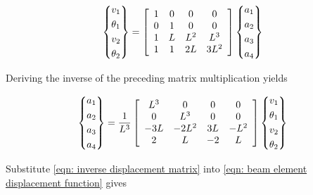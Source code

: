 \documentclass[a4paper,openany,nobib]{tufte-book}
\begin{document}
{{$$\left\{ \begin{gathered}
  v_1 \hfill \\
  \theta _1 \hfill \\
  v_2 \hfill \\
  \theta _2 \hfill \\ 
\end{gathered}  \right\} = \left[ {\begin{array}{*{20}{c}}
  1&0&0&0 \\ 
  0&1&0&0 \\ 
  1&L&L^2&L^3 \\ 
  1&1&2L&3L^2 
\end{array}} \right]\left\{ \begin{gathered}
  a_1 \hfill \\
  a_2 \hfill \\
  a_3 \hfill \\
  a_4 \hfill \\ 
\end{gathered}  \right\}$$

Deriving the inverse of the preceding matrix multiplication yields

\begin{gather*}
\label{eqn: inverse displacement matrix}
  \left\{
    \begin{gathered}
      a_1 \hfill \\
      a_2 \hfill \\
      a_3 \hfill \\
      a_4 \hfill \\ 
    \end{gathered}  \right\} = \frac{1}{L^3}\left[{
      \begin{array}{*{20}{c}}
        L^3&0&0&0 \\ 
        0&L^3&0&0 \\ 
        -3L&-2L^2&3L&-L^2 \\ 
        2&L&-2&L 
      \end{array}} \right]\left\{
    \begin{gathered}
      v_1 \hfill \\
      \theta_1 \hfill \\
      v_2 \hfill \\
      \theta_2 \hfill \\ 
    \end{gathered}  \right\}
\end{gather*}

Substitute
\ref{eqn: inverse displacement matrix}
into
\ref{eqn: beam element displacement function}
gives

}}
\end{document}
